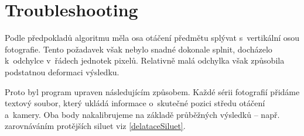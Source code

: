 \documentclass[12pt]{report}			%
\begin{document}
    	    \section{Troubleshooting}

    	        Podle předpokladů algoritmu měla osa otáčení předmětu splývat s~vertikální osou fotografie. Tento požadavek však nebylo snadné dokonale splnit, docházelo k~odchylce v~řádech jednotek pixelů. Relativně malá odchylka však způsobila podstatnou deformaci výsledku.

    	        Proto byl program upraven následujícím způsobem. Každé sérii fotografií přidáme textový soubor, který ukládá informace o~skutečné pozici středu otáčení a~kamery. Oba body nakalibrujeme na základě průběžných výsledků -- např. zarovnáváním protějších siluet viz \ref{delataceSiluet}.
\end{document}
